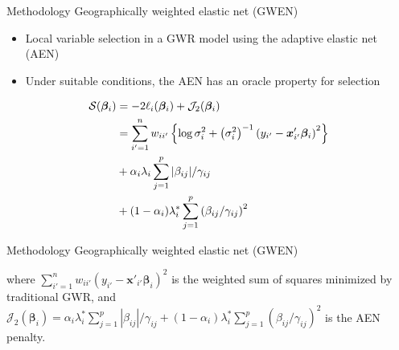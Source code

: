 \documentclass[12pt,t]{beamer}
\newcommand{\subt}[1]{{\footnotesize \color{subtitle} {#1}}}
\begin{document}
\begin{frame}{Methodology}
\subt{Geographically weighted elastic net (GWEN)}

\bigskip
\begin{itemize}
    \item Local variable selection in a GWR model using the adaptive elastic net (AEN) \citep{Zou:2009}
    \item Under suitable conditions, the AEN has an oracle property for selection
\end{itemize}

\begin{align}
		\mathcal{S}(\bm{\beta}_i) &= -2 \ell_i(\bm{\beta}_i) + \mathcal{J}_2(\bm{\beta}_i) \notag \\
		&= \sum_{i'=1}^n w_{ii'}  \left\{ \log{\sigma^2_i}  + \left(\sigma^2_i\right)^{-1}  \left(y_{i'} - \bm{x}'_{i'} \bm{\beta}_i \right)^2 \right\}   \notag \\
		&+ \alpha_i \lambda_i \sum_{j=1}^p |\beta_{ij}| / \gamma_{ij} \notag \\
		&+ (1-\alpha_i) \lambda^*_i \sum_{j=1}^p  \left( \beta_{ij} / \gamma_{ij} \right)^2 \notag
	\end{align}

\end{frame}



\begin{frame}{Methodology}
\subt{Geographically weighted elastic net (GWEN)}

\bigskip
where $\sum_{i'=1}^n w_{ii'} \left(y_{i'} - \bm{x}'_{i'} \bm{\beta}_i \right)^2$ is the weighted sum of squares minimized by traditional GWR, and $\mathcal{J}_2(\bm{\beta}_i) = \alpha_i \lambda^*_i \sum_{j=1}^p |\beta_{ij}| / \gamma_{ij} + (1-\alpha_i) \lambda^*_i \sum_{j=1}^p  \left( \beta_{ij} / \gamma_{ij} \right)^2$ is the AEN penalty.

\end{frame}
\end{document}
